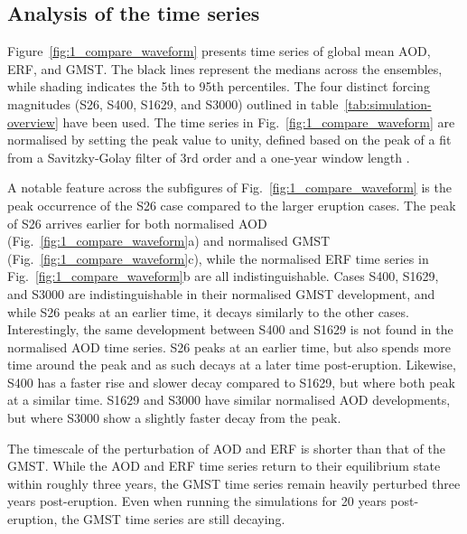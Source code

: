 \documentclass[draft]{agujournal2019}
\begin{document}
  \subsection{Analysis of the time series}

  Figure~\ref{fig:1_compare_waveform} presents time series of global mean AOD, ERF, and
  GMST. The black lines represent the medians across the ensembles, while shading
  indicates the 5th to 95th percentiles. The four distinct forcing magnitudes (S26,
  S400, S1629, and S3000) outlined in table~\ref{tab:simulation-overview} have been
  used. The time series in Fig.~\ref{fig:1_compare_waveform} are normalised by setting
  the peak value to unity, defined based on the peak of a fit from a Savitzky-Golay
  filter of 3rd order and a one-year window length \cite{savitzky1964}.

  A notable feature across the subfigures of Fig.~\ref{fig:1_compare_waveform} is the
  peak occurrence of the S26 case compared to the larger eruption cases. The peak of S26
  arrives earlier for both normalised AOD (Fig.~\ref{fig:1_compare_waveform}a) and
  normalised GMST (Fig.~\ref{fig:1_compare_waveform}c), while the normalised ERF time
  series in Fig.~\ref{fig:1_compare_waveform}b are all indistinguishable. Cases S400,
  S1629, and S3000 are indistinguishable in their normalised GMST development, and while
  S26 peaks at an earlier time, it decays similarly to the other cases. Interestingly,
  the same development between S400 and S1629 is not found in the normalised AOD time
  series. S26 peaks at an earlier time, but also spends more time around the peak and as
  such decays at a later time post-eruption. Likewise, S400 has a faster rise and slower
  decay compared to S1629, but where both peak at a similar time. S1629 and S3000 have
  similar normalised AOD developments, but where S3000 show a slightly faster decay from
  the peak.

  The timescale of the perturbation of AOD and ERF is shorter than that of the GMST.
  While the AOD and ERF time series return to their equilibrium state within roughly
  three years, the GMST time series remain heavily perturbed three years post-eruption.
  Even when running the simulations for 20 years post-eruption, the GMST time series are
  still decaying.
\end{document}
